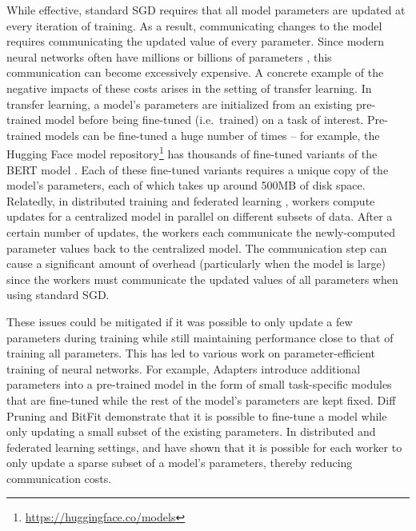 While effective, standard SGD requires that all model parameters are updated at every iteration of training. As a result, communicating changes to the model requires communicating the updated value of every parameter. Since modern neural networks often have millions or billions of parameters \citep{DBLP:journals/corr/abs-2006-10029, brown-gpt3-2020, raffel2020exploring}, this communication can become excessively expensive. A concrete example of the negative impacts of these costs arises in the setting of transfer learning. In transfer learning, a model's parameters are initialized from an existing pre-trained model before being fine-tuned (i.e.\ trained) on a task of interest. Pre-trained models can be fine-tuned a huge number of times -- for example, the Hugging Face model repository\footnote{\url{https://huggingface.co/models}} has thousands of fine-tuned variants of the BERT model \citep{devlin-etal-2019-bert}. Each of these fine-tuned variants requires a unique copy of the model's parameters, each of which takes up around 500MB of disk space. Relatedly, in distributed training \citep{Dean2012LargeSD} and federated learning \citep{mcmahan2017communicationefficient}, workers compute updates for a centralized model in parallel on different subsets of data. After a certain number of updates, the workers each communicate the newly-computed parameter values back to the centralized model. The communication step can cause a significant amount of overhead (particularly when the model is large) since the workers must communicate the updated values of all parameters when using standard SGD.

These issues could be mitigated if it was possible to only update a few parameters during training while still maintaining performance close to that of training all parameters. This has led to various work on parameter-efficient training of neural networks. For example, Adapters \citep{DBLP:journals/corr/abs-1902-00751,rebuffi2017learning,bapna2019simple} introduce additional parameters into a pre-trained model in the form of small task-specific modules that are fine-tuned while the rest of the model's parameters are kept fixed. Diff Pruning \citep{DBLP:journals/corr/abs-2012-07463} and BitFit \citep{benzaken2021bitfit} demonstrate that it is possible to fine-tune a model while only updating a small subset of the existing parameters. In distributed and federated learning settings, \citet{aji2017sparse} and \citet{konevcny2016bfederated} have shown that it is possible for each worker to only update a sparse subset of a model's parameters, thereby reducing communication costs.

